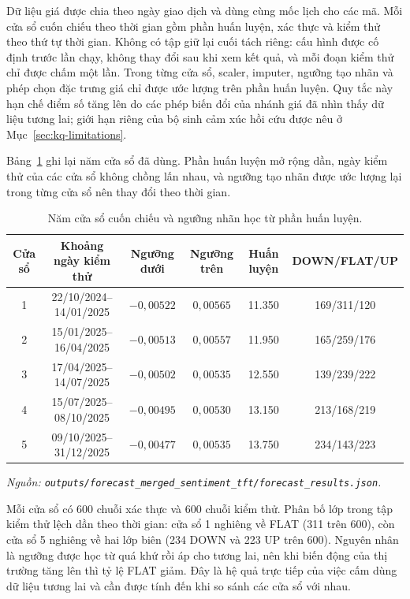 Dữ liệu giá được chia theo ngày giao dịch và dùng cùng mốc lịch cho các mã. Mỗi cửa sổ
cuốn chiếu theo thời gian gồm phần huấn luyện, xác thực và kiểm thử theo thứ tự thời gian.
Không có tập giữ lại cuối tách riêng: cấu hình được cố định trước lần chạy, không thay đổi
sau khi xem kết quả, và mỗi đoạn kiểm thử chỉ được chấm một lần. Trong từng cửa sổ, scaler,
imputer, ngưỡng tạo nhãn và phép chọn đặc trưng giá chỉ được ước lượng trên phần huấn luyện.
Quy tắc này hạn chế điểm số tăng lên do các phép biến đổi của nhánh giá đã nhìn thấy dữ
liệu tương lai; giới hạn riêng của bộ sinh cảm xúc hồi cứu được nêu ở
Mục~\ref{sec:kq-limitations}.

Bảng~\ref{tab:kq-windows} ghi lại năm cửa sổ đã dùng. Phần huấn luyện mở rộng dần, ngày
kiểm thử của các cửa sổ không chồng lấn nhau, và ngưỡng tạo nhãn được ước lượng lại trong
từng cửa sổ nên thay đổi theo thời gian.

\begin{table}[H]
  \centering
  \caption{Năm cửa sổ cuốn chiếu và ngưỡng nhãn học từ phần huấn luyện.}
  \label{tab:kq-windows}
  \begin{tabular}{c c c c c c}
    \toprule
    Cửa sổ & Khoảng ngày kiểm thử & Ngưỡng dưới & Ngưỡng trên & Huấn luyện & DOWN/FLAT/UP \\
    \midrule
    1 & 22/10/2024--14/01/2025 & $-0{,}00522$ & $0{,}00565$ & 11.350 & 169/311/120 \\
    2 & 15/01/2025--16/04/2025 & $-0{,}00513$ & $0{,}00557$ & 11.950 & 165/259/176 \\
    3 & 17/04/2025--14/07/2025 & $-0{,}00502$ & $0{,}00535$ & 12.550 & 139/239/222 \\
    4 & 15/07/2025--08/10/2025 & $-0{,}00495$ & $0{,}00530$ & 13.150 & 213/168/219 \\
    5 & 09/10/2025--31/12/2025 & $-0{,}00477$ & $0{,}00535$ & 13.750 & 234/143/223 \\
    \bottomrule
  \end{tabular}
\noindent\textit{Nguồn: \texttt{outputs/forecast\_merged\_sentiment\_tft/forecast\_results.json}.}
\end{table}

Mỗi cửa sổ có 600 chuỗi xác thực và 600 chuỗi kiểm thử. Phân bố lớp trong tập kiểm thử
lệch dần theo thời gian: cửa sổ 1 nghiêng về FLAT (311 trên 600), còn cửa sổ 5 nghiêng về
hai lớp biên (234 DOWN và 223 UP trên 600). Nguyên nhân là ngưỡng được học từ quá khứ rồi
áp cho tương lai, nên khi biến động của thị trường tăng lên thì tỷ lệ FLAT giảm. Đây là
hệ quả trực tiếp của việc cấm dùng dữ liệu tương lai và cần được tính đến khi so sánh các
cửa sổ với nhau.

